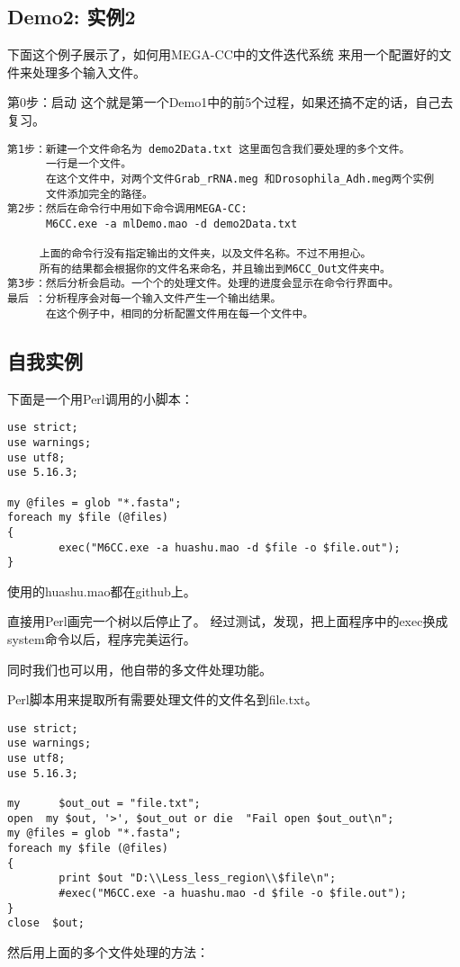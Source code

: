 \documentclass[11pt]{ctexart}
\begin{document}
\subsection{Demo2: 实例2}
\label{sec-3-7}

下面这个例子展示了，如何用MEGA-CC中的文件迭代系统
来用一个配置好的文件来处理多个输入文件。

第0步：启动
这个就是第一个Demo1中的前5个过程，如果还搞不定的话，自己去复习。


\begin{verbatim}
第1步：新建一个文件命名为 demo2Data.txt 这里面包含我们要处理的多个文件。
      一行是一个文件。
      在这个文件中，对两个文件Grab_rRNA.meg 和Drosophila_Adh.meg两个实例
      文件添加完全的路径。
第2步：然后在命令行中用如下命令调用MEGA-CC:
      M6CC.exe -a mlDemo.mao -d demo2Data.txt

     上面的命令行没有指定输出的文件夹，以及文件名称。不过不用担心。
     所有的结果都会根据你的文件名来命名，并且输出到M6CC_Out文件夹中。
第3步：然后分析会启动。一个个的处理文件。处理的进度会显示在命令行界面中。
最后 ：分析程序会对每一个输入文件产生一个输出结果。
      在这个例子中，相同的分析配置文件用在每一个文件中。
\end{verbatim}
\subsection{自我实例}
\label{sec-3-8}

下面是一个用Perl调用的小脚本：

\begin{verbatim}
use strict;
use warnings;
use utf8;
use 5.16.3;

my @files = glob "*.fasta";
foreach my $file (@files)
{
        exec("M6CC.exe -a huashu.mao -d $file -o $file.out");
}
\end{verbatim}
使用的huashu.mao都在github上。

直接用Perl画完一个树以后停止了。
经过测试，发现，把上面程序中的exec换成system命令以后，程序完美运行。

同时我们也可以用，他自带的多文件处理功能。

Perl脚本用来提取所有需要处理文件的文件名到file.txt。

\begin{verbatim}
use strict;
use warnings;
use utf8;
use 5.16.3;

my      $out_out = "file.txt";
open  my $out, '>', $out_out or die  "Fail open $out_out\n";
my @files = glob "*.fasta";
foreach my $file (@files)
{
        print $out "D:\\Less_less_region\\$file\n";
        #exec("M6CC.exe -a huashu.mao -d $file -o $file.out");
}
close  $out;
\end{verbatim}
然后用上面的多个文件处理的方法：
\end{document}
